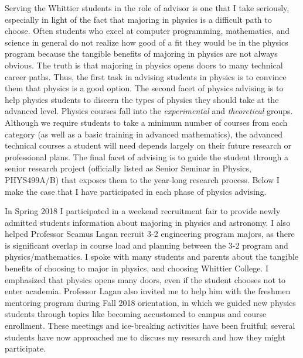 \documentclass[../main.tex]{subfiles}
\begin{document}
Serving the Whittier students in the role of advisor is one that I take seriously, especially in light of the fact that majoring in physics is a difficult path to choose.  Often students who excel at computer programming, mathematics, and science in general do not realize how good of a fit they would be in the physics program because the tangible benefits of majoring in physics are not always obvious.  The truth is that majoring in physics opens doors to many technical career paths.  Thus, the first task in advising students in physics is to convince them that physics is a good option.  The second facet of physics advising is to help physics students to discern the types of physics they should take at the advanced level.  Physics courses fall into the \textit{experimental} and \textit{theoretical} groups.  Although we require students to take a minimum number of courses from each category (as well as a basic training in advanced mathematics), the advanced technical courses a student will need depends largely on their future research or professional plans.  The final facet of advising is to guide the student through a senior research project (officially listed as Senior Seminar in Physics, PHYS499A/B) that exposes them to the year-long research process.  Below I make the case that I have participated in each phase of physics advising. \\ \hspace{0.1cm}

In Spring 2018 I participated in a weekend recruitment fair to provide newly admitted students information about majoring in physics and astronomy.  I also helped Professor Seamus Lagan recruit 3-2 engineering program majors, as there is significant overlap in course load and planning between the 3-2 program and physics/mathematics.  I spoke with many students and parents about the tangible benefits of choosing to major in physics, and choosing Whittier College.  I emphasized that physics opens many doors, even if the student chooses not to enter academia.  Professor Lagan also invited me to help him with the freshmen mentoring program during Fall 2018 orientation, in which we guided new physics students through topics like becoming accustomed to campus and course enrollment.  These meetings and ice-breaking activities have been fruitful; several students have now approached me to discuss my research and how they might participate. \\ \hspace{0.1cm}
\end{document}

